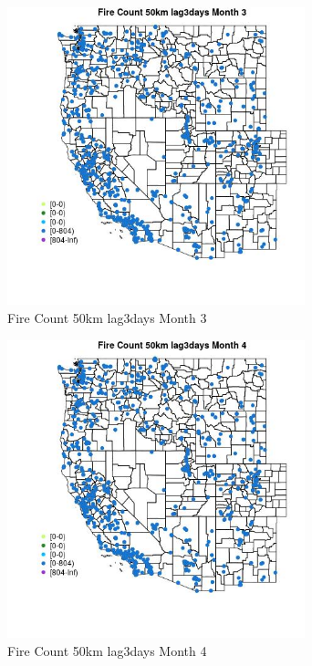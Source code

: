 \begin{figure} 
\centering  
\includegraphics[width=0.77\textwidth]{Code_Outputs/Report_ML_input_PM25_Step4_part_f_de_duplicated_aves_prioritize_24hr_obswNAs_MapObsMo3Fire_Count_50km_lag3days.jpg} 
\caption{\label{fig:Report_ML_input_PM25_Step4_part_f_de_duplicated_aves_prioritize_24hr_obswNAsMapObsMo3Fire_Count_50km_lag3days}Fire Count 50km lag3days Month 3} 
\end{figure} 
 

\begin{figure} 
\centering  
\includegraphics[width=0.77\textwidth]{Code_Outputs/Report_ML_input_PM25_Step4_part_f_de_duplicated_aves_prioritize_24hr_obswNAs_MapObsMo4Fire_Count_50km_lag3days.jpg} 
\caption{\label{fig:Report_ML_input_PM25_Step4_part_f_de_duplicated_aves_prioritize_24hr_obswNAsMapObsMo4Fire_Count_50km_lag3days}Fire Count 50km lag3days Month 4} 
\end{figure} 
 

